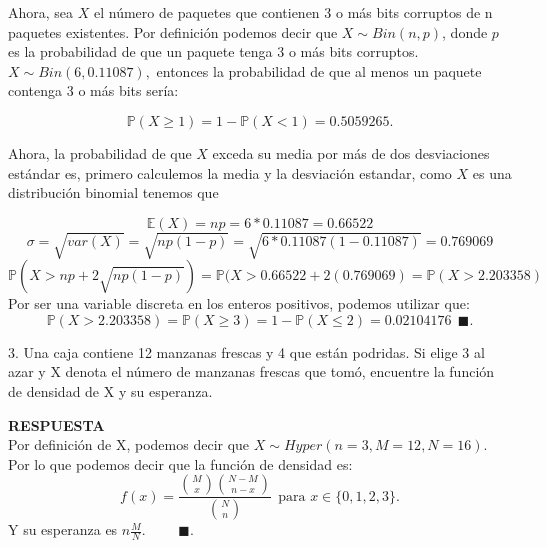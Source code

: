 \documentclass[11pt,letterpaper]{article}
\newcommand{\mP}{\mathbb{P}}
\newcommand{\mE}{\mathbb{E}}
\newcommand{\res}{\textbf{RESPUESTA}\\}
\newcommand{\fin}{$\blacksquare.$}
\newcommand{\finf}{\blacksquare.}
\begin{document}
\begin{itemize}
Ahora, sea $X$ el número de paquetes que contienen 3 o más bits corruptos de n paquetes existentes. Por definición podemos decir que $X\sim Bin(n,p)$, donde $p$ es la probabilidad de que un paquete tenga 3 o más bits corruptos. $X\sim Bin(6,0.11087),$ entonces la probabilidad de que al menos un paquete contenga 3 o más bits sería:

$$\mP(X\geq1)=1-\mP(X<1)=0.5059265.$$

Ahora, la probabilidad de que $X$ exceda su media por más de dos desviaciones estándar es, primero calculemos la media y la desviación estandar, como $X$ es una distribución binomial tenemos que 

$$\mE(X)=np=6*0.11087=0.66522$$
$$\sigma=\sqrt{var(X)} =\sqrt{np(1-p)}=\sqrt{6*0.11087(1-0.11087)}=0.769069$$
$$\mP(X>np+2\sqrt{np(1-p)})=\mP(X>0.66522+2(0.769069)=\mP(X> 2.203358) $$
Por ser una variable discreta en los enteros positivos, podemos utilizar que:
$$\mP(X> 2.203358)=\mP (X\geq 3)=1-\mP(X\leq2)=0.02104176 \ \ \finf$$

3. Una caja contiene 12 manzanas frescas y 4 que están podridas. Si elige 3 al azar y X denota el
número de manzanas frescas que tomó, encuentre la función de densidad de X y su esperanza.

\res 
Por definición de X, podemos decir que $X\sim Hyper(n=3, M=12, N=16)$. Por lo que podemos decir que la función de densidad es:
\begin{equation*}
f(x)= \frac{{M\choose x}{N-M\choose n-x}}{{N\choose n}}\ \ \text{para } x\in \{0,1,2,3\}.
\end{equation*}
Y su esperanza es $n\frac{M}{N}.$ \ \ \ \ \fin
\end{itemize}
\end{document}
